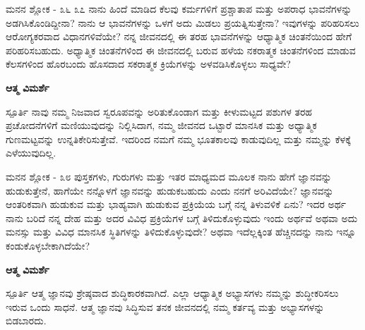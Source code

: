 \newpage
\begin{mananam}{\mananamfont \large ಮನನ ಶ್ಲೋಕ - ೩೬ ೩೭}
\mananamtext ನಾನು ಹಿಂದೆ ಮಾಡಿದ ಕೆಲವು ಕರ್ಮಗಳಿಗೆ ಪ್ರಶ್ಚಾತಾಪ  ಮತ್ತು ಅಪರಾಧ ಭಾವನೆಗಳನ್ನು ಅಡಗಿಸಿಕೊಂಡಿದ್ದೀನಾ? ನಾನು ಆ ಭಾವನೆಗಳನ್ನು ಒಳಗೆ ಅದು ಮಿಡಲು ಪ್ರಯತ್ನಿಸುತ್ತೇನಾ? ಇವುಗಳನ್ನು ಪರಿಹರಿಸಲು ಆರೋಗ್ಯಕರವಾದ ವಿಧಾನಗಳಿವೆಯೇ? ನನ್ನ ಜೀವನದಲ್ಲಿ ಈ ತರಹ ಭಾವನೆಗಳನ್ನು ಆಧ್ಯಾತ್ಮಿಕ ಚಿಂತನೆಯಿಂದ ಹೇಗೆ ಪರಿಹರಿಸಬಹುದು. ಅಧ್ಯಾತ್ಮಿಕ ಚಿಂತನೆಗಳಿಂದ ಈ ಜೀವನದಲ್ಲಿ ಬರುವ ಹಳೆಯ ನಕರಾತ್ಮಕ ಚಿಂತನೆಗಳಿಂದ ಮಾಡುವ ಕೆಲಸಗಳಿಂದ ಹೊರಬಂದು ಹೊಸದಾದ ಸಕರಾತ್ಮಕ ಕ್ರಿಯೆಗಳನ್ನು ಅಳವಡಿಸಿಕೊಳ್ಳಲು ಸಾಧ್ಯವೇ?\\
\end{mananam}
\WritingHand\enspace\textbf{ಆತ್ಮ ವಿಮರ್ಶೆ}\\
\begin{inspiration}{\mananamfont \large ಸ್ಪೂರ್ತಿ}
\mananamtext ನಾವು ನಮ್ಮ ನಿಜವಾದ ಸ್ವರೂಪವನ್ನು ಅರಿತುಕೊಂಡಾಗ ಮತ್ತು ಕೀಳುಮಟ್ಟದ ಪಶುಗಳ ತರಹ ಪ್ರಚೋದನೆಗಳಿಗೆ ಮಣಿಯುವುದನ್ನು ನಿಲ್ಲಿಸಿದಾಗ, ನಮ್ಮ ಜೀವನದ ಒಟ್ಟಾರೆ ಮಾನಸಿಕ ಮತ್ತು ಅಧ್ಯಾತ್ಮಿಕ ಗುಣಮಟ್ಟವನ್ನು ಉನ್ನತಿಕೇರಿಸುತ್ತೇವೆ. ಇದರಿಂದ ನಮಗೆ ನಮ್ಮ ಭೂತಕಾಲವು ಕಾಡುವುದಿಲ್ಲ ಮತ್ತು ನಮ್ಮನ್ನು ಕೆಳಕ್ಕೆ ಎಳೆಯುವುದಿಲ್ಲ.
\end{inspiration}
\newpage

\begin{mananam}{\mananamfont \large ಮನನ ಶ್ಲೋಕ - ೩೮}
\mananamtext ಪುಸ್ತಕಗಳು, ಗುರುಗಳು ಮತ್ತು ಇತರ ಮಾಧ್ಯಮದ ಮೂಲಕ ನಾನು ಹೇಗೆ ಜ್ಞಾನವನ್ನು ಹುಡುಕುತ್ತೇನೆ, ಹಾಗೆಯೇ ನನ್ನೊಳಗೆ ಜ್ಞಾನವನ್ನು ಹುಡುಕಬಹುದು ಎಂದು ನನಗೆ ಅರಿವಿದೆಯೇ? ಜ್ಞಾನವನ್ನು ಆಂತರಿಕವಾಗಿ ಹುಡುಕುವ ಮತ್ತು ಭಾಹ್ಯವಾಗಿ ಹುಡುಕುವ ಪ್ರಕ್ರಿಯೆಯ ಬಗ್ಗೆ ನನ್ನ ತಿಳುವಳಿಕೆ ಏನು? ಇದರ ಅರ್ಥ ನಾನು ಬರಿದೆ ನನ್ನ ದೇಹ ಮತ್ತು ಅದರ ವಿವಿಧ ಪ್ರಕ್ರಿಯೆಗಳ ಬಗ್ಗೆ ತಿಳಿದುಕೊಳ್ಳುವುದು ಇಂದು ಅರ್ಥವೆ ಅಥವಾ ಅದು ಮನಸ್ಸು ಮತ್ತು ವಿವಿಧ ಮಾನಸಿಕ ಸ್ಥಿತಿಗಳನ್ನು  ತಿಳಿದುಕೊಳ್ಳುವುದೇ?    ಅಥವಾ ಇದೆಲ್ಲಕ್ಕಿಂತ ಹೆಚ್ಚಿನದನ್ನು ನಾನು ಇನ್ನೂ ಕಂಡುಕೊಳ್ಳಬೇಕಾಗಿದೆಯೇ?\\
\end{mananam}
\WritingHand\enspace\textbf{ಆತ್ಮ ವಿಮರ್ಶೆ}\\
\begin{inspiration}{\mananamfont \large ಸ್ಪೂರ್ತಿ}
\mananamtext ಆತ್ಮ ಜ್ಞಾನವು ಶ್ರೇಷ್ಠವಾದ ಶುದ್ಧಿಕಾರಕವಾಗಿದೆ. ಎಲ್ಲಾ ಆಧ್ಯಾತ್ಮಿಕ ಅಭ್ಯಾಸಗಳು ನಮ್ಮನ್ನು ಶುದ್ಧೀಕರಿಸಲು ಇರುವ ಒಂದು ಸಾಧನೆ. ಆತ್ಮ ಜ್ಞಾನವು ಸಿದ್ಧಿಸುವ ತನಕ  ಜೀವನದಲ್ಲಿ ನಮ್ಮ ಕರ್ತವ್ಯ ಮತ್ತು ಅಭ್ಯಾಸಗಳನ್ನು ಬಿಡಬಾರದು.
\end{inspiration}

